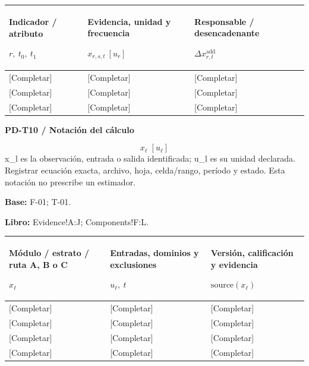 {\sffamily\fontsize{8.3}{10.3}\selectfont\begin{longtable}{@{}P{56.09mm} P{57.74mm} P{51.14mm}@{}}
\toprule
\textbf{Indicador / atributo}\par {\normalfont\fontsize{8.2}{10}\selectfont $r,\ t_0,\ t_1$} & \textbf{Evidencia, unidad y frecuencia}\par {\normalfont\fontsize{8.2}{10}\selectfont $x_{r,s,t}\ [u_r]$} & \textbf{Responsable / desencadenante}\par {\normalfont\fontsize{8.2}{10}\selectfont $\Delta x_{r,t}^{\mathrm{add}}$}\\\midrule\endhead
\rule{0pt}{7.7mm}[Completar] & [Completar] & [Completar]\\\hline
\rule{0pt}{7.7mm}[Completar] & [Completar] & [Completar]\\\hline
\rule{0pt}{7.7mm}[Completar] & [Completar] & [Completar]\\\hline
\end{longtable}}
\par\begingroup\sffamily\fontsize{8}{10}\selectfont\color{NEBGreen}\setlength{\parskip}{2pt}\setlength{\abovedisplayskip}{4pt}\setlength{\belowdisplayskip}{4pt}\setlength{\abovedisplayshortskip}{2pt}\setlength{\belowdisplayshortskip}{3pt}
\textbf{PD-T10 / Notación del cálculo}\par
{\fontsize{9}{11}\selectfont\[ x_{\ell}\;[u_{\ell}] \]}
x\_l es la observación, entrada o salida identificada; u\_l es su unidad declarada. Registrar ecuación exacta, archivo, hoja, celda/rango, período y estado. Esta notación no prescribe un estimador.\par
\textbf{Base:} F-01; T-01.\par
\textbf{Libro:} Evidence!A:J; Components!F:L.\par\endgroup
{\sffamily\fontsize{8.3}{10.3}\selectfont\begin{longtable}{@{}P{56.09mm} P{54.44mm} P{54.44mm}@{}}
\toprule
\textbf{Módulo / estrato / ruta A, B o C}\par {\normalfont\fontsize{8.2}{10}\selectfont $x_{\ell}$} & \textbf{Entradas, dominios y exclusiones}\par {\normalfont\fontsize{8.2}{10}\selectfont $u_{\ell},\ t$} & \textbf{Versión, calificación y evidencia}\par {\normalfont\fontsize{8.2}{10}\selectfont $\text{source}(x_{\ell})$}\\\midrule\endhead
\rule{0pt}{7.7mm}[Completar] & [Completar] & [Completar]\\\hline
\rule{0pt}{7.7mm}[Completar] & [Completar] & [Completar]\\\hline
\rule{0pt}{7.7mm}[Completar] & [Completar] & [Completar]\\\hline
\rule{0pt}{7.7mm}[Completar] & [Completar] & [Completar]\\\hline
\end{longtable}}
